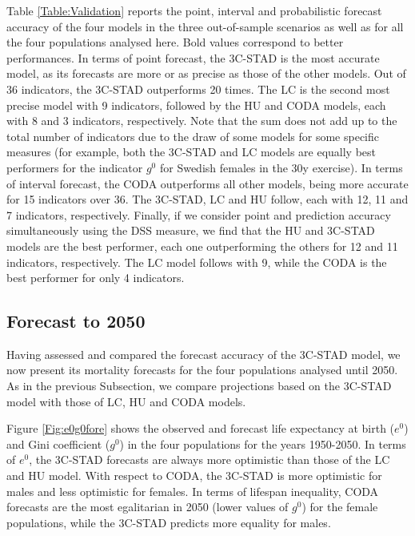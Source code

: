 \documentclass[11pt, a4paper]{article}
\begin{document}
Table \ref{Table:Validation} reports the point, interval and {\color{red}probabilistic} forecast accuracy of the four models in the three out-of-sample scenarios as well as for all the four populations analysed here. Bold values correspond to better performances. In terms of point forecast, the 3C-STAD is the most accurate model, as its forecasts are more or as precise as those of the other models. Out of 36 indicators, the 3C-STAD outperforms 20 times. The LC is the second most precise model with {\color{red}9} indicators, followed by the HU and CODA models, each with {\color{red}8} and 3 indicators, respectively. Note that the sum does not add up to the total number of indicators due to the draw of some models for some specific measures {\color{red}(for example, both the 3C-STAD and LC models are equally best performers for the indicator $g^0$ for Swedish females in the 30y exercise)}. In terms of interval forecast, the CODA outperforms all other models, being more accurate for 15 indicators over 36. The 3C-STAD, {\color{red}LC} and HU follow, each with {\color{red}12, 11 and 7} indicators, respectively. {\color{red}Finally, if we consider point and prediction accuracy simultaneously using the DSS measure, we find that the HU and 3C-STAD models are the best performer, each one outperforming the others for 12 and 11 indicators, respectively. The LC model follows with 9, while the CODA is the best performer for only 4 indicators.}  


\subsection{Forecast to 2050}\label{Subsec:Forecast2050}

Having assessed and compared the forecast accuracy of the 3C-STAD model, we now present its mortality forecasts for the four populations analysed until 2050. As in the previous Subsection, we compare projections based on the 3C-STAD model with those of LC, HU and CODA models.

Figure \ref{Fig:e0g0fore} shows the observed and forecast life expectancy at birth ($e^{0}$) and Gini coefficient ($g^{0}$) in the four populations for the years 1950-2050. In terms of $e^{0}$, the 3C-STAD forecasts are always more optimistic than those of the LC and HU model. With respect to CODA, the 3C-STAD is more optimistic for males and less optimistic for females. In terms of lifespan inequality, CODA forecasts are the most egalitarian in 2050 (lower values of $g^{0}$) for the female populations, while the 3C-STAD predicts more equality for males.
\end{document}
